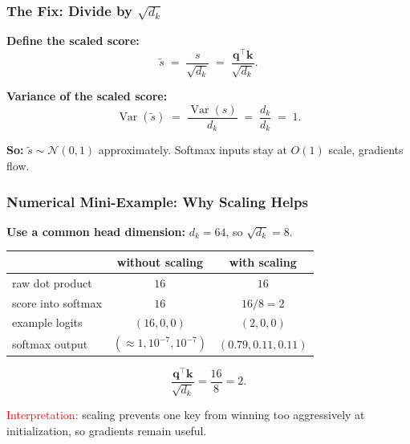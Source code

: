 \documentclass[notes,11pt, aspectratio=169]{beamer}
\DeclareMathOperator{\softmax}{softmax}
\DeclareMathOperator{\Var}{Var}
\newcommand{\vk}{\mathbf{k}}
\newcommand{\vq}{\mathbf{q}}
\newcommand{\vK}{\mathbf{K}}
\newcommand{\vQ}{\mathbf{Q}}
\newcommand{\vV}{\mathbf{V}}
\begin{document}
\begin{frame}
\frametitle{The Fix: Divide by $\sqrt{d_k}$}

\textbf{Define the scaled score:}
\[
    \tilde{s} \;=\; \frac{s}{\sqrt{d_k}} \;=\; \frac{\vq^\top \vk}{\sqrt{d_k}}.
\]

\vspace{6pt}
\textbf{Variance of the scaled score:}
\[
    \Var(\tilde{s}) \;=\; \frac{\Var(s)}{d_k} \;=\; \frac{d_k}{d_k} \;=\; 1.
\]

\vspace{8pt}
\textbf{So:} $\tilde s \sim \mathcal{N}(0, 1)$ approximately. Softmax inputs stay at $O(1)$ scale, gradients flow.

\vspace{8pt}

\end{frame}

\begin{frame}
\frametitle{Numerical Mini-Example: Why Scaling Helps}

\textbf{Use a common head dimension:} $d_k = 64$, so $\sqrt{d_k} = 8$.

\vspace{4pt}
\begin{center}
\renewcommand{\arraystretch}{1.2}
\small
\begin{tabular}{l c c}
\toprule
& \textbf{without scaling} & \textbf{with scaling} \\
\midrule
raw dot product & $16$ & $16$ \\
score into softmax & $16$ & $16/8 = 2$ \\
example logits & $(16,0,0)$ & $(2,0,0)$ \\
softmax output & $(\approx 1, 10^{-7}, 10^{-7})$ & $(0.79, 0.11, 0.11)$ \\
\bottomrule
\end{tabular}
\end{center}

\vspace{6pt}
\[
    \frac{\vq^\top \vk}{\sqrt{d_k}}
    =
    \frac{16}{8}
    =
    2.
\]

\textcolor{red}{Interpretation:} scaling prevents one key from winning too aggressively at initialization, so gradients remain useful.
\end{frame}
\end{document}

